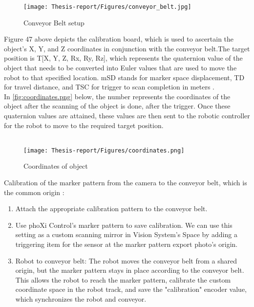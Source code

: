\documentclass[12pt]{article}
\begin{document}
\begin{figure}[h]
    \centering
    \texttt{[image: Thesis-report/Figures/conveyor\_belt.jpg]} 
    \caption{Conveyor Belt setup \cite{ref21}}
    \label{fig:Photoneo Cmaera}
\end{figure}
Figure 47 above depicts the calibration board, which is used to ascertain the object's X, Y, and Z coordinates in conjunction with the conveyor belt.The target position is T[X, Y, Z, Rx, Ry, Rz], which represents the quaternion value of the object that needs to be converted into Euler values that are used to move the robot to that specified location. mSD stands for marker space displacement, TD for travel distance, and TSC for trigger to scan completion in meters \cite{ref21}. \\


In \autoref{fig:coordinates.png} below, the number represents the coordinates of the object after the scanning of the object is done, after the trigger. Once these quaternion values are attained, these values are then sent to the robotic controller for the robot to move to the required target position.\\\\
\begin{figure}[h]
    \centering
    \texttt{[image: Thesis-report/Figures/coordinates.png]} 
    \caption{Coordinates of object}
    \label{fig:coordinates.png}
\end{figure}

Calibration of the marker pattern from the camera to the conveyor belt, which is the common origin \cite{ref21}:
\begin{enumerate}
    \item Attach the appropriate calibration pattern to the conveyor belt.
    \item Use phoXi Control's marker pattern to save calibration. We can use this setting as a custom scanning mirror in Vision System's Space by adding a triggering item for the sensor at the marker pattern export photo's origin.
    \item Robot to conveyor belt: The robot moves the conveyor belt from a shared origin, but the marker pattern stays in place according to the conveyor belt. This allows the robot to reach the marker pattern, calibrate the custom coordinate space in the robot track, and save the "calibration" encoder value, which synchronizes the robot and conveyor\cite{ref21}.
\end{enumerate}
\end{document}
